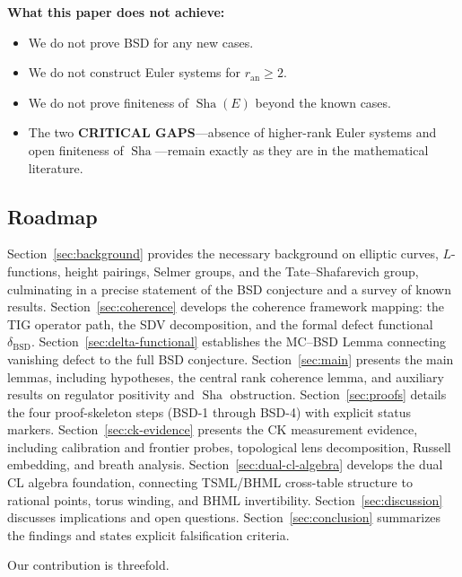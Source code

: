 \documentclass[11pt]{article}
\DeclareMathOperator{\Sha}{Sha}
\begin{document}
\textbf{What this paper does not achieve:}
\begin{itemize}
  \item We do not prove BSD for any new cases.
  \item We do not construct Euler systems for $r_{\mathrm{an}} \geq 2$.
  \item We do not prove finiteness of $\Sha(E)$ beyond the known cases.
  \item The two \textbf{CRITICAL GAPS}---absence of higher-rank Euler systems
    and open finiteness of $\Sha$---remain exactly as they are in the
    mathematical literature.
\end{itemize}

\subsection*{Roadmap}

Section~\ref{sec:background} provides the necessary background on elliptic
curves, $L$-functions, height pairings, Selmer groups, and the Tate--Shafarevich
group, culminating in a precise statement of the BSD conjecture and a survey of
known results.  Section~\ref{sec:coherence} develops the coherence framework
mapping: the TIG operator path, the SDV decomposition, and the formal defect
functional $\delta_{\mathrm{BSD}}$.  Section~\ref{sec:delta-functional}
establishes the MC--BSD Lemma connecting vanishing defect to the full BSD
conjecture.  Section~\ref{sec:main} presents the main lemmas, including
hypotheses, the central rank coherence lemma, and auxiliary results on regulator
positivity and $\Sha$ obstruction.  Section~\ref{sec:proofs} details the four
proof-skeleton steps (BSD-1 through BSD-4) with explicit status markers.
Section~\ref{sec:ck-evidence} presents the CK measurement evidence, including
calibration and frontier probes, topological lens decomposition, Russell
embedding, and breath analysis.  Section~\ref{sec:dual-cl-algebra} develops
the dual CL algebra foundation, connecting TSML/BHML cross-table structure
to rational points, torus winding, and BHML invertibility.
Section~\ref{sec:discussion} discusses
implications and open questions.  Section~\ref{sec:conclusion} summarizes the
findings and states explicit falsification criteria.

Our contribution is threefold.
\end{document}
